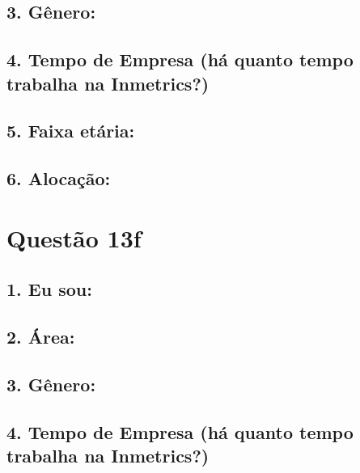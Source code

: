 \documentclass[]{book}
\begin{document}
\hypertarget{genero-21}{%
\subsection{3. Gênero:}\label{genero-21}}

\hypertarget{tempo-de-empresa-ha-quanto-tempo-trabalha-na-inmetrics-21}{%
\subsection{4. Tempo de Empresa (há quanto tempo trabalha na Inmetrics?)}\label{tempo-de-empresa-ha-quanto-tempo-trabalha-na-inmetrics-21}}

\hypertarget{faixa-etaria-21}{%
\subsection{5. Faixa etária:}\label{faixa-etaria-21}}

\hypertarget{alocacao-21}{%
\subsection{6. Alocação:}\label{alocacao-21}}

\hypertarget{questao-13f}{%
\section{Questão 13f}\label{questao-13f}}

\hypertarget{eu-sou-22}{%
\subsection{1. Eu sou:}\label{eu-sou-22}}

\hypertarget{area-22}{%
\subsection{2. Área:}\label{area-22}}

\hypertarget{genero-22}{%
\subsection{3. Gênero:}\label{genero-22}}

\hypertarget{tempo-de-empresa-ha-quanto-tempo-trabalha-na-inmetrics-22}{%
\subsection{4. Tempo de Empresa (há quanto tempo trabalha na Inmetrics?)}\label{tempo-de-empresa-ha-quanto-tempo-trabalha-na-inmetrics-22}}
\end{document}

